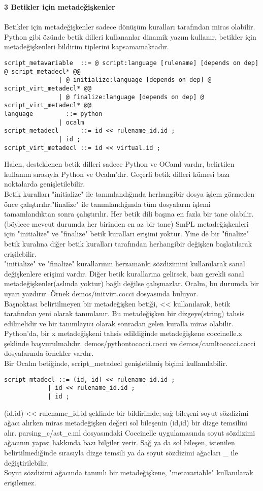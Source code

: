 \documentclass[a4paper,20pt, right=2cm]{article}
\begin{document}
\textbf{3 Betikler için metadeğişkenler}\\
\\
Betikler için metadeğişkenler sadece dönüşüm kuralları tarafından miras olabilir. Python gibi özünde betik dilleri kullananlar dinamik yazım kullanır, betikler için metadeğişkenleri bildirim tiplerini kapsamamaktadır.
\begin{lstlisting}[basicstyle=\small]
script_metavariable  ::= @ script:language [rulename] [depends on dep] @ script_metadecl* @@
		       | @ initialize:language [depends on dep] @ script_virt_metadecl* @@
		       | @ finalize:language [depends on dep] @ script_virt_metadecl* @@
language	     ::= python
		       | ocalm
script_metadecl      ::= id << rulename_id.id ;
		       | id ;
script_virt_metadecl ::= id << virtual.id ;
\end{lstlisting}
Halen, desteklenen betik dilleri sadece  Python ve OCaml vardır, belirtilen kullanım sırasıyla Python ve Ocalm'dır. Geçerli betik dilleri kümesi bazı noktalarda genişletilebilir.\\ 
Betik kuralları "initialize" ile tanımlandığında herhangibir dosya işlem görmeden önce çalıştırılır."finalize" ile tanımlandığında tüm dosyaların işlemi tamamlandıktan sonra çalıştırılır. Her betik dili başına en fazla bir tane olabilir. (böylece mevcut durumda her birinden en az bir tane) SmPL metadeğişkenleri için "initialize" ve "finalize" betik kuralları erişimi yoktur. Yine de bir "finalize" betik kuralına diğer betik kuralları tarafından herhangibir değişken başlatılarak erişilebilir.\\
"initialize" ve "finalize" kurallarının herzamanki sözdizimini kullanılarak sanal değişkenlere erişimi vardır. Diğer betik kurallarına gelirsek, bazı gerekli sanal metadeğişkenler(aslında yoktur) bağlı değilse çalışmazlar. Ocalm, bu durumda bir uyarı yazdırır. Örnek demos/initvirt.cocci dosyasında buluyor.\\
Başnoktası belirtilmeyen bir metadeğişken betiği, << kullanılarak, betik tarafından yeni olarak tanımlanır. Bu metadeğişken bir dizgeye(string) tahsis edilmelidir ve bir tanımlayıcı olarak sonradan gelen kuralla miras olabilir. Python'da, bir x metadeğişkeni tahsis edildiğinde metadeğişkene coccinelle.x şeklinde başvurulmalıdır. demos/pythontococci.cocci ve demos/camltococci.cocci dosyalarında örnekler vardır.\\
Bir Ocalm betiğinde, script\_metadecl genişletilmiş biçimi kullanılabilir.
\begin{lstlisting}
script_mtadecl ::= (id, id) << rulename_id.id ;
			| id << rulename_id.id ;
			| id ;
\end{lstlisting}
(id,id) << rulename\_id.id şeklinde bir bildirimde; sağ bileşeni soyut sözdizimi ağacı alırken miras metadeğişken değeri sol bileşenin (id,id)  bir dizge temsilini alır. parsing\_c/ast\_c.ml dosyasındaki Coccinelle uygulamasında soyut sözdizimi ağacının yapısı hakkında bazı bilgiler verir. Sağ ya da sol bileşen, istenilen belirtilmediğinde sırasıyla dizge temsili ya da soyut sözdizimi ağacları \_ ile değiştirilebilir.\\ 
Soyut sözdizimi ağacında tanımlı bir metadeğişkene, "metavariable" kullanılarak erişilemez.
\end{document}
